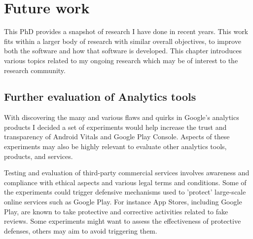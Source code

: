 \chapter{Future work}
This PhD provides a snapshot of research I have done in recent years. This work fits within a larger body of research with similar overall objectives, to improve both the software and how that software is developed. This chapter introduces various topics related to my ongoing research which may be of interest to the research community.

\section{Further evaluation of Analytics tools}

With discovering the many and various flaws and quirks in Google's analytics products I decided a set of experiments would help increase the trust and transparency of Android Vitals and Google Play Console. Aspects of these experiments may also be highly relevant to evaluate other analytics tools, products, and services. 

Testing and evaluation of third-party commercial services involves awareness and compliance with ethical aspects and various legal terms and conditions. Some of the experiments could trigger defensive mechanisms used to 'protect' large-scale online services such as Google Play. For instance App Stores, including Google Play, are known to take protective and corrective activities related to fake reviews. Some experiments might want to assess the effectiveness of protective defenses, others may aim to avoid triggering them. 

